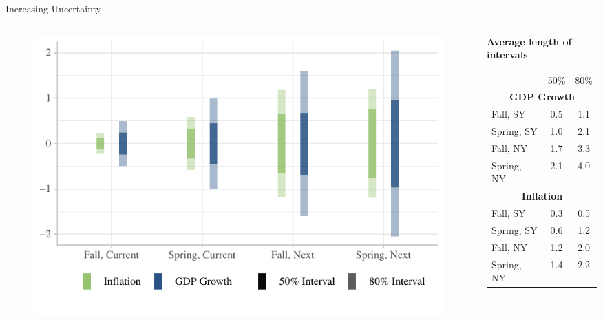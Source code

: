 \documentclass[en]{sdqbeamer}
\begin{document}
\begin{frame}{Increasing Uncertainty}
\begin{columns}
\begin{column}{0.6\textwidth}
    \begin{figure}
        \centering
        \includegraphics[width=\textwidth]{figures/cilength_byhorizon_ho.pdf}
        \label{fig:enter-label}
    \end{figure}
\end{column}
\begin{column}{0.4\textwidth}
\centering
\textbf{Average length of intervals}
\begin{table}
\begin{tabular}{ l c c }
&   50\%  & 80\%\\[0.3em]
\multicolumn{3}{c}{\textbf{GDP Growth}}\\
Fall,  SY & 0.5 & 1.1\\ 
Spring, SY &1.0 &2.1 \\ 
Fall, NY & 1.7 & 3.3\\ 
Spring, NY &2.1 &4.0 \\[0.3em] 
\multicolumn{3}{c}{\textbf{Inflation}}\\
Fall,  SY & 0.3 & 0.5\\ 
Spring, SY &0.6 &1.2 \\ 
Fall, NY & 1.2 & 2.0\\ 
Spring, NY &1.4 &2.2 \\ 
\end{tabular}
\end{table}
\vspace{1.25cm}
\end{column}
\end{columns}


\end{frame}
\end{document}
